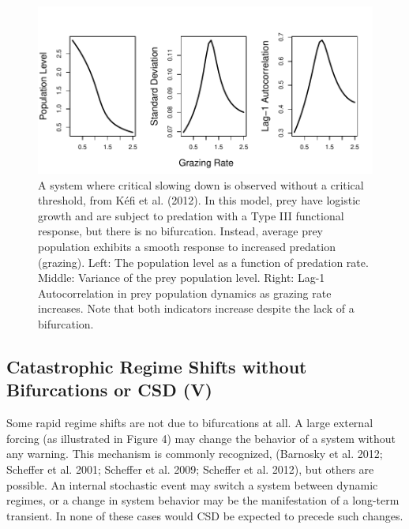 \documentclass[author-year, review]{elsarticle} %
\makeatletter
\def\maxwidth{\ifdim\Gin@nat@width>\linewidth\linewidth
\else\Gin@nat@width\fi}
\let\Oldincludegraphics\includegraphics
\renewcommand{\includegraphics}[1]{\Oldincludegraphics[width=\maxwidth]{#1}}
\makeatother
\begin{document}
\begin{figure}[htbp]
\centering
\includegraphics{kefi-fig.pdf}
\caption{A system where critical slowing down is observed without a
critical threshold, from Kéfi et al. (2012). In this model, prey have
logistic growth and are subject to predation with a Type III functional
response, but there is no bifurcation. Instead, average prey population
exhibits a smooth response to increased predation (grazing). Left: The
population level as a function of predation rate. Middle: Variance of
the prey population level. Right: Lag-1 Autocorrelation in prey
population dynamics as grazing rate increases. Note that both indicators
increase despite the lack of a bifurcation.}
\end{figure}

\subsection{Catastrophic Regime Shifts without Bifurcations or CSD (V)}

Some rapid regime shifts are not due to bifurcations at all. A large
external forcing (as illustrated in Figure 4) may change the behavior of
a system without any warning. This mechanism is commonly recognized,
(Barnosky et al. 2012; Scheffer et al. 2001; Scheffer et al. 2009;
Scheffer et al. 2012), but others are possible. An internal stochastic
event may switch a system between dynamic regimes, or a change in system
behavior may be the manifestation of a long-term transient. In none of
these cases would CSD be expected to precede such changes.
\end{document}
